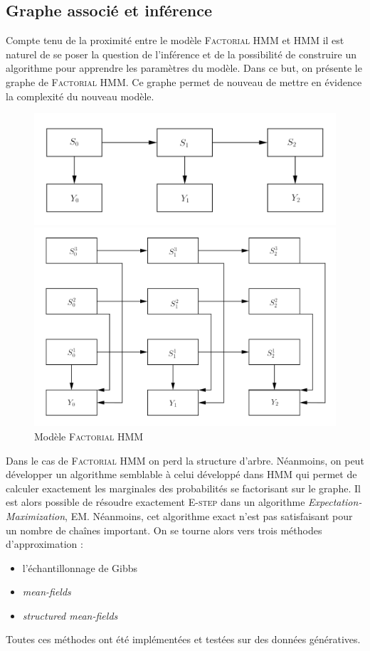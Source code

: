 \documentclass[10pt,a4paper]{article}
\newcommand{\hmm}{\textsc{HMM}}
\newcommand{\fhmm}{\textsc{Factorial HMM}}
\newcommand{\Estep}{\textsc{E-step}}
\newcommand{\EM}{\textsc{EM}}
\begin{document}
\subsection{Graphe associé et inférence} 
Compte tenu de la proximité entre le modèle \fhmm{} et \hmm{} il est naturel de 
se 
poser la question de l'inférence et de la possibilité de construire un 
algorithme pour apprendre les paramètres du modèle.
Dans ce but, on présente le graphe de \fhmm.
Ce graphe permet de nouveau de mettre en évidence la complexité du nouveau 
modèle.
\begin{figure}[H]
\centering
\begin{minipage}{.46\linewidth}
\centering
\includegraphics[scale=0.2]{../resources/pictures/graph1.png}
\caption{Modèle \hmm}
\end{minipage}
\begin{minipage}{.46\linewidth}
\centering
\includegraphics[scale=0.2]{../resources/pictures/graph2.png}
\caption{Modèle \fhmm}
\end{minipage}
\end{figure}
Dans le cas de \fhmm{} on perd la structure d'arbre.
Néanmoins, on peut développer un algorithme semblable à celui développé dans 
\hmm{} qui permet de calculer exactement les marginales des probabilités se 
factorisant sur le graphe.
Il est alors possible de résoudre exactement \Estep{} dans un algorithme 
\emph{Expectation-Maximization}, \EM. Néanmoins, cet algorithme exact n'est pas 
satisfaisant pour un nombre de chaînes important.
On se tourne alors vers trois méthodes d'approximation :
\begin{itemize}
\item l'échantillonnage de Gibbs
\item \textit{mean-fields}
\item \textit{structured mean-fields}
\end{itemize}
Toutes ces méthodes ont été implémentées et testées sur des données génératives.
\end{document}
